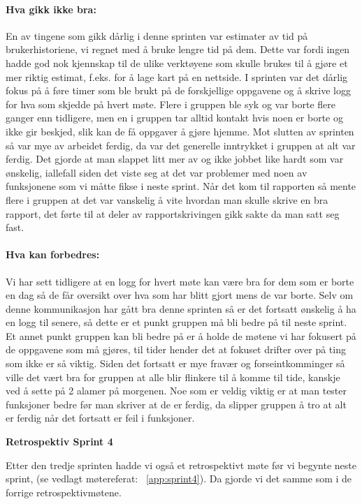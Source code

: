 \documentclass[12pt,a4paper,norsk]{article}
\begin{document}
\paragraph{Hva gikk ikke bra:}
En av tingene som gikk dårlig i denne sprinten var estimater av tid på brukerhistoriene, vi regnet med å bruke lengre tid på dem. Dette var fordi ingen hadde god nok kjennskap til de ulike verktøyene som skulle brukes til å gjøre et mer riktig estimat, f.eks. for å lage kart på en nettside.
I sprinten var det dårlig fokus på å føre timer som ble brukt på de forskjellige oppgavene og å skrive logg for hva som skjedde på hvert møte.
Flere i gruppen ble syk og var borte flere ganger enn tidligere, men en i gruppen tar alltid kontakt hvis noen er borte og ikke gir beskjed, slik kan de få oppgaver å gjøre hjemme.
Mot slutten av sprinten så var mye av arbeidet ferdig, da var det generelle inntrykket i gruppen at alt var ferdig. Det gjorde at man slappet litt mer av og ikke jobbet like hardt som var ønskelig, iallefall siden det viste seg at det var problemer med noen av funksjonene som vi måtte fikse i neste sprint.
Når det kom til rapporten så mente flere i gruppen at det var vanskelig å vite hvordan man skulle skrive en bra rapport, det førte til at deler av rapportskrivingen gikk sakte da man satt seg fast.

\paragraph{Hva kan forbedres:}
Vi har sett tidligere at en logg for hvert møte kan være bra for dem som er borte en dag så de får oversikt over hva som har blitt gjort mens de var borte. Selv om denne kommunikasjon har gått bra denne sprinten så er det fortsatt ønskelig å ha en logg til senere, så dette er et punkt gruppen må bli bedre på til neste sprint.
Et annet punkt gruppen kan bli bedre på er å holde de møtene vi har fokusert på de oppgavene som må gjøres, til tider hender det at fokuset drifter over på ting som ikke er så viktig. Siden det fortsatt er mye fravær og forseintkomminger så ville det vært bra for gruppen at alle blir flinkere til å komme til tide, kanskje ved å sette på 2 alamer på morgenen.
Noe som er veldig viktig er at man tester funksjoner bedre før man skriver at de er ferdig, da slipper gruppen å tro at alt er ferdig når det fortsatt er feil i funksjoner.


\bigskip \noindent \textbf{Retrospektiv Sprint 4}
\par Etter den tredje sprinten hadde vi også et retrospektivt møte før vi begynte neste sprint, (se vedlagt møtereferat: ~\cref{app:sprint4}). Da gjorde vi det samme som i de forrige retrospektivmøtene.
\end{document}
